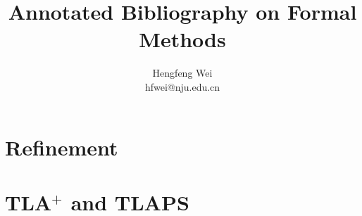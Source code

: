 \documentclass[12pt, letterpaper]{article}
\begin{document}
\title{Annotated Bibliography on Formal Methods}
\author{Hengfeng Wei \\ hfwei@nju.edu.cn}

\maketitle
\thispagestyle{fancy}
\section{Refinement} \label{section:refinement}

\section{TLA$^{+}$ and TLAPS} \label{section:tla}

 
\end{document}
